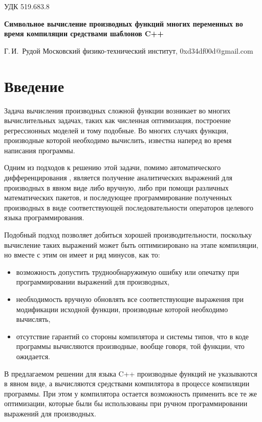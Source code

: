 \documentclass[11pt,a4paper]{article}
\begin{document}
УДК 519.683.8
\begin{center}
  \textbf{Символьное вычисление производных функций многих переменных во время компиляции средствами шаблонов C++}

  \bigskip
  Г.\,И.~Рудой
  Московский физико-технический институт, 0xd34df00d@gmail.com
\end{center}

\section{Введение}

Задача вычисления производных сложной функции возникает во многих вычислительных
задачах, таких как численная оптимизация, построение регрессионных моделей
\cite{Rudoy16StabilityAnalysis} и тому подобные. Во многих случаях функция,
производные которой необходимо вычислить, известна наперед во время написания
программы.

Одним из подходов к решению этой задачи, помимо автоматического дифференцирования \cite{Neidinger2010Introduction},
является получение аналитических выражений для производных в явном виде либо вручную,
либо при помощи различных математических пакетов, и последующее программирование
полученных производных в виде соответствующей последовательности операторов целевого
языка программирования.

Подобный подход позволяет добиться хорошей производительности, поскольку вычисление
таких выражений может быть оптимизировано на этапе компиляции, но вместе с этим он
имеет и ряд минусов, как то:
\begin{itemize}
  \item возможность допустить труднообнаружимую ошибку или опечатку при
	программировании выражений для производных,
  \item необходимость вручную обновлять все соответствующие выражения при модификации
	исходной функции, производные которой необходимо вычислять,
  \item отсутствие гарантий со стороны компилятора и системы типов, что в коде
	программы вычисляются производные, вообще говоря, той функции, что ожидается.
\end{itemize}

В предлагаемом решении \cite{Rudoy16IAmMad} для языка C++ производные функций не указываются в явном виде,
а вычисляются средствами компилятора в процессе компиляции программы. При этом у
компилятора остается возможность применить все те же оптимизации, которые были бы
использованы при ручном программировании выражений для производных.
\end{document}
